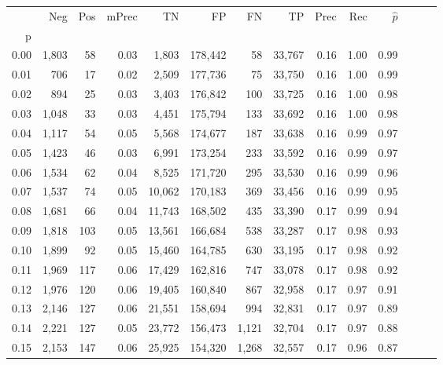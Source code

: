 \begin{tabular}{rrrrrrrrrrrrrr}
\toprule
{} &    Neg &  Pos & mPrec &       TN &       FP &      FN &      TP &  Prec &   Rec & $\hat{p}$ \\
p    &        &      &       &          &          &         &         &       &       &           \\
\midrule
0.00 &  1,803 &   58 &  0.03 &    1,803 &  178,442 &      58 &  33,767 &  0.16 &  1.00 &      0.99 \\
0.01 &    706 &   17 &  0.02 &    2,509 &  177,736 &      75 &  33,750 &  0.16 &  1.00 &      0.99 \\
0.02 &    894 &   25 &  0.03 &    3,403 &  176,842 &     100 &  33,725 &  0.16 &  1.00 &      0.98 \\
0.03 &  1,048 &   33 &  0.03 &    4,451 &  175,794 &     133 &  33,692 &  0.16 &  1.00 &      0.98 \\
0.04 &  1,117 &   54 &  0.05 &    5,568 &  174,677 &     187 &  33,638 &  0.16 &  0.99 &      0.97 \\
0.05 &  1,423 &   46 &  0.03 &    6,991 &  173,254 &     233 &  33,592 &  0.16 &  0.99 &      0.97 \\
0.06 &  1,534 &   62 &  0.04 &    8,525 &  171,720 &     295 &  33,530 &  0.16 &  0.99 &      0.96 \\
0.07 &  1,537 &   74 &  0.05 &   10,062 &  170,183 &     369 &  33,456 &  0.16 &  0.99 &      0.95 \\
0.08 &  1,681 &   66 &  0.04 &   11,743 &  168,502 &     435 &  33,390 &  0.17 &  0.99 &      0.94 \\
0.09 &  1,818 &  103 &  0.05 &   13,561 &  166,684 &     538 &  33,287 &  0.17 &  0.98 &      0.93 \\
0.10 &  1,899 &   92 &  0.05 &   15,460 &  164,785 &     630 &  33,195 &  0.17 &  0.98 &      0.92 \\
0.11 &  1,969 &  117 &  0.06 &   17,429 &  162,816 &     747 &  33,078 &  0.17 &  0.98 &      0.92 \\
0.12 &  1,976 &  120 &  0.06 &   19,405 &  160,840 &     867 &  32,958 &  0.17 &  0.97 &      0.91 \\
0.13 &  2,146 &  127 &  0.06 &   21,551 &  158,694 &     994 &  32,831 &  0.17 &  0.97 &      0.89 \\
0.14 &  2,221 &  127 &  0.05 &   23,772 &  156,473 &   1,121 &  32,704 &  0.17 &  0.97 &      0.88 \\
0.15 &  2,153 &  147 &  0.06 &   25,925 &  154,320 &   1,268 &  32,557 &  0.17 &  0.96 &      0.87 \\

\end{tabular}
